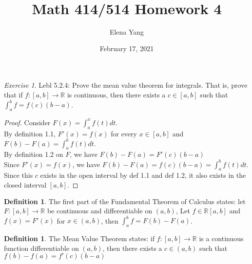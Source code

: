 \documentclass[12pt,oneside]{amsart}
\title{Math 414/514 Homework 4}
\author{Elena Yang}
\date{February 17, 2021}
\theoremstyle{definition}
\newtheorem{definition}[equation]{Definition}
\theoremstyle{remark}
\newtheorem{exer}{Exercise}
\numberwithin{equation}{exer}
\begin{document}
\maketitle

\begin{exer}
Lebl 5.2.4: Prove the mean value theorem for integrals. That is, prove that if $f:[a,b]\rightarrow \mathbb{R}$ is continuous, then there exists a $c\in [a,b]$ such that $\int_{a}^{b}f=f(c)(b-a)$.
\end{exer}

\begin{proof}
Consider $F(x)=\int_{a}^{x}f(t)dt$.\\ By definition 1.1, $F'(x)=f(x)$ for every $x\in[a,b]$ and $F(b)-F(a)=\int_{a}^{b}f(t)dt$. \\
By definition 1.2 on $F$, we have $F(b)-F(a)=F'(c)(b-a)$ \\
Since $F'(x)=f(x)$, we have $F(b)-F(a)=f(c)(b-a)=\int_{a}^{b}f(t)dt$. \\
Since this $c$ exists in the open interval by def 1.1 and def 1.2, it also exists in the closed interval $[a,b]$.
\end{proof}
\newpage
\begin{definition}
The first part of the Fundamental Theorem of Calculus states: let $F:[a,b]\rightarrow\mathbb{R}$ be continuous and differentiable on $(a,b)$, Let $f\in\mathbb{R}[a,b]$  and $f(x)=F'(x)$ for $x\in(a,b)$, then $\int_{a}^{b}f=F(b)-F(a)$. 
\end{definition}
\begin{definition}
The Mean Value Theorem states: if $f:[a,b]\rightarrow\mathbb{R}$ is a continuous function differentiable on $(a,b)$, then there exists a $c\in(a,b)$ such that $f(b)-f(a)=f'(c)(b-a)$ 
\end{definition}
\end{document}
